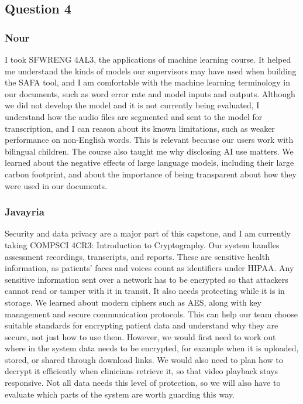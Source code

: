\documentclass[12pt]{article}
\begin{document}
\subsection*{Question 4}
\subsubsection*{Nour}
I took SFWRENG 4AL3, the applications of machine learning course. 
It helped me understand the kinds of models our supervisors may have used when building the SAFA tool, and I am comfortable with the machine learning terminology in our documents, such as word error rate and model inputs and outputs. 
Although we did not develop the model and it is not currently being evaluated, I understand how the audio files are segmented and sent to the model for transcription, and I can reason about its known limitations, such as weaker performance on non-English words. 
This is relevant because our users work with bilingual children. The course also taught me why disclosing AI use matters. 
We learned about the negative effects of large language models, including their large carbon footprint, and about the importance of being transparent about how they were used in our documents.

\subsubsection*{Javayria}
Security and data privacy are a major part of this capstone, and I am currently taking COMPSCI 4CR3: Introduction to Cryptography. Our system handles assessment recordings, transcripts, and reports. These are sensitive health information, as patients' faces and voices count as identifiers under HIPAA. Any sensitive information sent over a network has to be encrypted so that attackers cannot read or tamper with it in transit. It also needs protecting while it is in storage. We learned about modern ciphers such as AES, along with key management and secure communication protocols. This can help our team choose suitable standards for encrypting patient data and understand why they are secure, not just how to use them. However, we would first need to work out where in the system data needs to be encrypted, for example when it is uploaded, stored, or shared through download links. We would also need to plan how to decrypt it efficiently when clinicians retrieve it, so that video playback stays responsive. Not all data needs this level of protection, so we will also have to evaluate which parts of the system are worth guarding this way.
\end{document}
